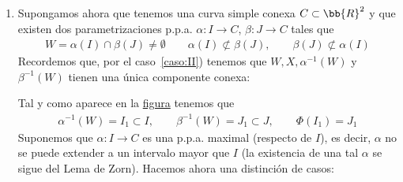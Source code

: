 \begin{observacion}
\begin{enumerate}
        Concluimos que $C$ ha de ser una curva de Jordan del tipo que estudiamos en el apartado~\ref{ej:periodica} del Ejemplo~\ref{ej:construccion}.

        \item Supongamos ahora que tenemos una curva simple conexa $C\subset \bb{R}^2$ y que existen dos parametrizaciones p.p.a. $\alpha:I \to C$, $\beta: J \to C$ tales que 
        \begin{gather*}
            W =  \alpha(I)\cap\beta(J)\neq \emptyset \qquad \alpha(I)\not\subset \beta(J), \qquad \beta(J)\not\subset \alpha(I)
        \end{gather*}
        Recordemos que, por el caso~\ref{caso:II}) tenemos que $W,X,\alpha^{-1}(W)$ y $\beta^{-1}(W)$ tienen una única componente conexa:
        \begin{figure}[H]\label{fig:una_cc}
            \centering
            \begin{subfigure}[b]{0.30\textwidth}
                \centering
            \end{subfigure}%
        \end{figure}
        Tal y como aparece en la \hyperref[fig:una_cc]{figura} tenemos que 
        \begin{gather*}
            \alpha^{-1}(W) = I_1 \subset I,\qquad \beta^{-1}(W) = J_1 \subset J,\qquad \Phi(I_1)=J_1
        \end{gather*}
        Suponemos que $\alpha: I  \to C$ es una p.p.a. maximal (respecto de $I$), es decir, $\alpha$ no se puede extender a un intervalo mayor que $I$ (la existencia de una tal $\alpha$ se sigue del Lema de Zorn). Hacemos ahora una distinción de casos:


\end{enumerate}
\end{observacion}

